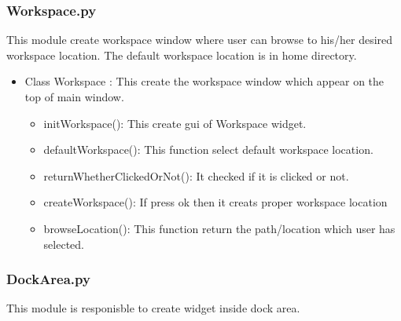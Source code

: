 \documentclass[12pt]{article}
\begin{document}
\subsubsection{Workspace.py}

This module create workspace window where user can browse to his/her desired workspace location. The default workspace location is in home directory.

\begin{itemize}
	\item Class Workspace : This create the workspace window which appear on the top of main window.
	\begin{itemize}
		\item initWorkspace(): This create gui of Workspace widget.
		\item defaultWorkspace(): This function select default workspace location.
		\item returnWhetherClickedOrNot(): It checked if it is clicked or not.
		\item createWorkspace(): If press ok then it creats proper workspace location
		\item browseLocation(): This function return the path/location which user has selected.
		
	\end{itemize}

\end{itemize}


\subsubsection{DockArea.py}

This module is responisble to create widget inside dock area.
\end{document}
